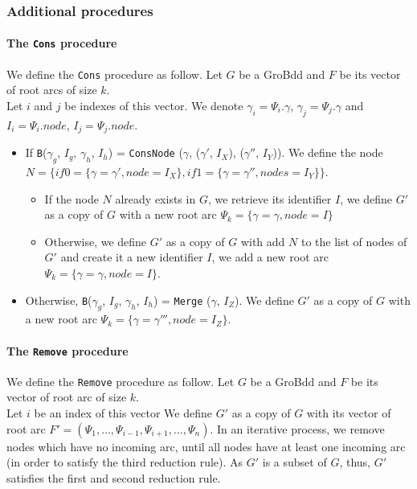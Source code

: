 \documentclass[a4paper,10pt]{article}
\begin{document}
\subsubsection{Additional procedures}

\paragraph{The \texttt{Cons} procedure\\}
We define the \texttt{Cons} procedure as follow.
Let $G$ be a GroBdd and $F$ be its vector of root arcs of size $k$.\\
Let $i$ and $j$ be indexes of this vector.
We denote $\gamma_i = \Psi_i.\gamma$, $\gamma_j = \Psi_j.\gamma$ and $I_i = \Psi_i.node$, $I_j = \Psi_j.node$.
\begin{itemize}
\item If \texttt{B}($\gamma_g$, $I_g$, $\gamma_h$, $I_h$) = \texttt{ConsNode} ($\gamma$, ($\gamma'$, $I_X$), ($\gamma''$, $I_Y$)). We define the node $N = \{if0 = \{\gamma = \gamma', node = I_X\}, if1 = \{\gamma = \gamma'', nodes = I_Y\}\}$.\begin{itemize}
\item If the node $N$ already exists in $G$, we retrieve its identifier $I$, we define $G'$ as a copy of $G$ with a new root arc $\Psi_k = \{\gamma = \gamma, node = I\}$
\item Otherwise, we define $G'$ as a copy of $G$ with add $N$ to the list of nodes of $G'$ and create it a new identifier $I$, we add a new root arc $\Psi_k = \{\gamma = \gamma, node = I\}$.
\end{itemize}
\item Otherwise, \texttt{B}($\gamma_g$, $I_g$, $\gamma_h$, $I_h$) = \texttt{Merge} ($\gamma$, $I_Z$). We define $G'$ as a copy of $G$ with a new root arc $\Psi_k = \{\gamma = \gamma''', node = I_Z\}$.
\end{itemize}

\paragraph{The \texttt{Remove} procedure\\}
We define the \texttt{Remove} procedure as follow.
Let $G$ be a GroBdd and $F$ be its vector of root arc of size $k$.\\
Let $i$ be an index of this vector
We define $G'$ as a copy of $G$ with its vector of root arc $F' = (\Psi_1, \dots, \Psi_{i-1}, \Psi_{i+1}, \dots, \Psi_n)$.
In an iterative process, we remove nodes which have no incoming arc, until all nodes have at least one incoming arc (in order to satisfy the third reduction rule).
As $G'$ is a subset of $G$, thus, $G'$ satisfies the first and second reduction rule.
\end{document}
